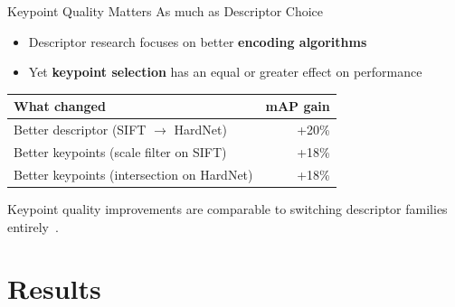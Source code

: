 \documentclass[aspectratio=169, 12pt]{beamer}
\begin{document}
\begin{frame}{Keypoint Quality Matters As much as Descriptor Choice}
  \begin{itemize}
    \item Descriptor research focuses on better \textbf{encoding algorithms}
    \item Yet \textbf{keypoint selection} has an equal or greater effect on performance
  \end{itemize}
  \vfill
  \begin{table}[h]
  \centering
  \begin{tabular}{lr}
    \toprule
    \textbf{What changed} & \textbf{mAP gain} \\
    \midrule
    Better descriptor (SIFT $\to$ HardNet) & +20\% \\
    Better keypoints (scale filter on SIFT) & +18\% \\
    Better keypoints (intersection on HardNet) & +18\% \\
    \bottomrule
  \end{tabular}
  \end{table}
  \vfill
  {\small Keypoint quality improvements are comparable to switching descriptor families entirely~\cite{lowe2004distinctive, mishchuk2017working}.}
\end{frame}




\section{Results}
\end{document}
